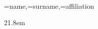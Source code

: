 \documentclass{article}
\begin{document}
{\name=name,\surname=surname,\affiliation=affiliation}
 {
    \BgThispage
    \topskip21.8em
    \begin{center}
    \calligra
    {\fontsize{50}{60}\selectfont \name \surname}
    \end{center}
    \vspace*{\fill}
    \newpage
 }
\end{document}
